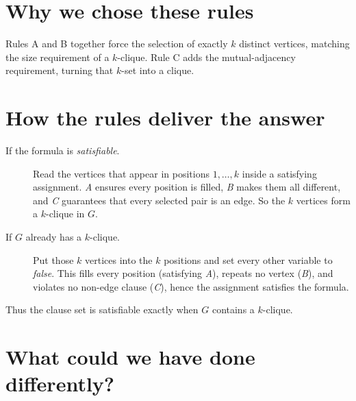 \documentclass[11pt]{article}
\begin{document}
\section*{Why we chose these rules}
Rules A and B together force the selection of exactly $k$ distinct vertices, matching the size requirement of a $k$-clique.  
Rule C adds the mutual-adjacency requirement, turning that $k$-set into a clique.

\section*{How the rules deliver the answer}
\begin{description}
  \item[If the formula is \emph{satisfiable}.]  
        Read the vertices that appear in positions $1,\dots,k$ inside a satisfying assignment.  
        \emph{A} ensures every position is filled, \emph{B} makes them all different, and \emph{C} guarantees that every selected pair is an edge.  
        So the $k$ vertices form a $k$-clique in $G$.
  \item[If $G$ already has a $k$-clique.]  
        Put those $k$ vertices into the $k$ positions and set every other variable to \textit{false}.  
        This fills every position (satisfying \emph{A}), repeats no vertex (\emph{B}), and violates no non-edge clause (\emph{C}), hence the assignment satisfies the formula.
\end{description}

Thus the clause set is satisfiable exactly when $G$ contains a $k$-clique.

\section*{What could we have done differently?}
\end{document}

